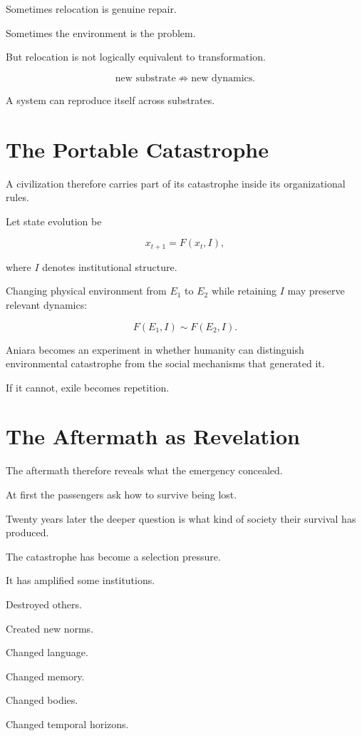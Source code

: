 \documentclass[11pt,oneside]{book}
\theoremstyle{definition}
\theoremstyle{remark}
\begin{document}
Sometimes relocation is genuine repair.

Sometimes the environment is the problem.

But relocation is not logically equivalent to transformation.

\[
\text{new substrate}
\not\Rightarrow
\text{new dynamics}.
\]

A system can reproduce itself across substrates.

\section{The Portable Catastrophe}

A civilization therefore carries part of its catastrophe inside its organizational rules.

Let state evolution be

\[
x_{t+1}=F(x_t,I),
\]

where \(I\) denotes institutional structure.

Changing physical environment from \(E_1\) to \(E_2\) while retaining \(I\) may preserve relevant dynamics:

\[
F(E_1,I)
\sim
F(E_2,I).
\]

Aniara becomes an experiment in whether humanity can distinguish environmental catastrophe from the social mechanisms that generated it.

If it cannot, exile becomes repetition.

\section{The Aftermath as Revelation}

The aftermath therefore reveals what the emergency concealed.

At first the passengers ask how to survive being lost.

Twenty years later the deeper question is what kind of society their survival has produced.

The catastrophe has become a selection pressure.

It has amplified some institutions.

Destroyed others.

Created new norms.

Changed language.

Changed memory.

Changed bodies.

Changed temporal horizons.
\end{document}
